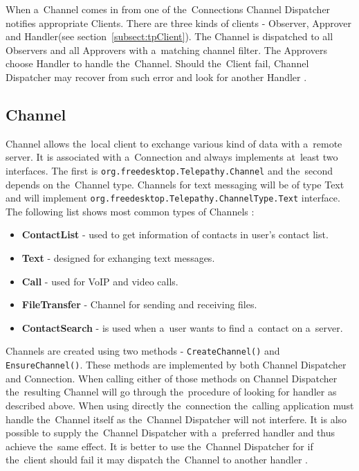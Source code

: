 When a~Channel comes in from one of the~Connections Channel Dispatcher notifies appropriate Clients. There are three kinds of clients - Observer, Approver and Handler(see section~\ref{subsect:tpClient}). The Channel is dispatched to all Observers and all Approvers with a~matching channel filter. The Approvers choose Handler to handle the~Channel. Should the~Client fail, Channel Dispatcher may recover from such error and look for another Handler \cite{TPWiki}.


\subsection*{Channel}
Channel allows the~local client to exchange various kind of data with a~remote server. It is associated with a~Connection and always implements at~least two interfaces. The first is \verb|org.freedesktop.Telepathy.Channel| and the~second depends on the~Channel type. Channels for text messaging will be of type Text and will implement \newline \verb|org.freedesktop.Telepathy.ChannelType.Text| interface. The following list shows most common types of Channels \cite{TPWiki}:

\begin{itemize}

	\item {\bf ContactList} - used to get information of contacts in user's contact list.

	\item {\bf Text} - designed for exhanging text messages. 

	\item {\bf Call} - used for VoIP and video calls. 

	\item {\bf FileTransfer} - Channel for sending and receiving files.

	\item {\bf ContactSearch} - is used when a~user wants to find a~contact on a~server.

\end{itemize}

Channels are created using two methods - \verb|CreateChannel()| and \verb|EnsureChannel()|. These methods are implemented by both Channel Dispatcher and Connection. When calling either of those methods on Channel Dispatcher the~resulting Channel will go through the~procedure of looking for handler as described above. When using directly the~connection the~calling application must handle the~Channel itself as the~Channel Dispatcher will not interfere. It is also possible to supply the~Channel Dispatcher with a~preferred handler and thus achieve the~same effect. It is better to use the~Channel Dispatcher for if the~client should fail it may dispatch the~Channel to another handler \cite{TPWiki}.

